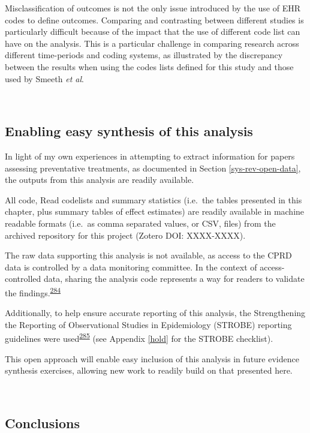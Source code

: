 \documentclass[a4paper, twoside]{templates/ociamthesis}
\begin{document}
Misclassification of outcomes is not the only issue introduced by the use of EHR codes to define outcomes. Comparing and contrasting between different studies is particularly difficult because of the impact that the use of different code list can have on the analysis. This is a particular challenge in comparing research across different time-periods and coding systems, as illustrated by the discrepancy between the results when using the codes lists defined for this study and those used by Smeeth \emph{et al}.

~

\hypertarget{cprd-data-avail}{%
\subsection{Enabling easy synthesis of this analysis}\label{cprd-data-avail}}

In light of my own experiences in attempting to extract information for papers assessing preventative treatments, as documented in Section \ref{sys-rev-open-data}, the outputs from this analysis are readily available.

All code, Read codelists and summary statistics (i.e.~the tables presented in this chapter, plus summary tables of effect estimates) are readily available in machine readable formats (i.e.~as comma separated values, or CSV, files) from the archived repository for this project (Zotero DOI: XXXX-XXXX).

The raw data supporting this analysis is not available, as access to the CPRD data is controlled by a data monitoring committee. In the context of access-controlled data, sharing the analysis code represents a way for readers to validate the findings.\textsuperscript{\protect\hyperlink{ref-goldacre2019c}{284}}

Additionally, to help ensure accurate reporting of this analysis, the Strengthening the Reporting of Observational Studies in Epidemiology (STROBE) reporting guidelines were used\textsuperscript{\protect\hyperlink{ref-vandenbroucke2007}{285}} (see Appendix \ref{hold} for the STROBE checklist).

This open approach will enable easy inclusion of this analysis in future evidence synthesis exercises, allowing new work to readily build on that presented here.

~

\hypertarget{conclusions-1}{%
\subsection{Conclusions}\label{conclusions-1}}
\end{document}
